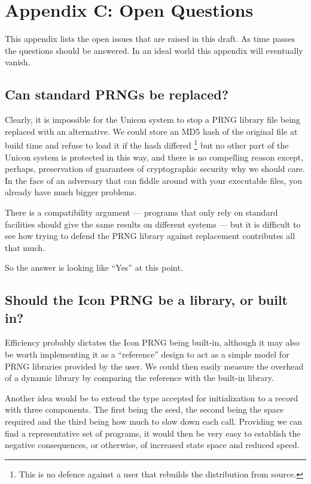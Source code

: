 \documentclass[letterpaper,12pt]{article}
\begin{document}

\pagebreak
\section*{Appendix C: Open Questions}
This appendix lists the open issues that are raised in this draft. As time
passes the questions should be answered. In an ideal world this appendix
will eventually vanish.

\subsection*{Can standard PRNGs be replaced?}
Clearly, it is impossible for the Unicon system to stop a PRNG library file
being replaced with an alternative. We could store an MD5 hash of the
original file at build time and refuse to load it if the hash differed%
\footnote{
  This is no defence against a user that rebuilds the distribution from
  source.
}
but no other part of the Unicon system is protected in this way, and there
is no compelling reason except, perhaps, preservation of guarantees of
cryptographic security why we should care. In the face of an adversary that
can fiddle around with your executable files, you already have much bigger
problems.

There is a compatibility argument --- programs that only rely on standard
facilities should give the same results on different systems --- but it is
difficult to see how trying to defend the PRNG library against replacement
contributes all that much.

So the answer is looking like ``Yes'' at this point.

\subsection*{Should the Icon PRNG be a library, or built in?}
Efficiency probably dictates the Icon PRNG being built-in, although it may
also be worth implementing it as a ``reference'' design to act as a simple
model for PRNG libraries provided by the user.
We could then easily measure the overhead of a dynamic library by comparing
the reference with the built-in library.

Another idea would be to extend the type accepted for initialization to a
record with three components. The first being the seed, the second being
the space required and the third being how much to slow down each call.
Providing we can find a representative set of programs, it would then be
very easy to establish the negative consequences, or otherwise, of
increased state space and reduced speed.
\end{document}

